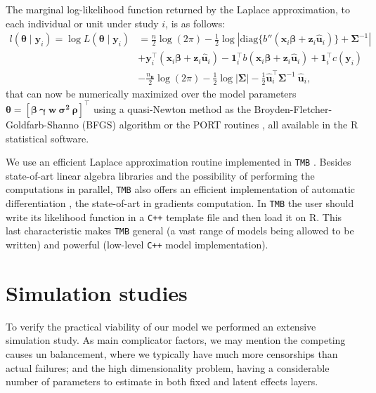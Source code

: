 \documentclass[a4paper,12pt]{article}
\begin{document}
The marginal log-likelihood function returned by the Laplace
approximation, to each individual or unit under study \(i\), is as
follows:
\begin{equation}
 \begin{aligned}
  l(\bm{\theta} \mid \bm{y}_{i}) =
  \log L(\bm{\theta} \mid \bm{y}_{i}) &= \frac{n}{2} \log (2\pi) -
  \frac{1}{2} \log
  \left| \text{diag}\{{b}''(\bm{x}_{i}\bm{\beta} +
                      \bm{z}_{i}\bm{\hat{u}}_{i})
                    \} + \bm{\Sigma}^{-1}
  \right|\\
  &+ \bm{y}_{i}^{\top}
     (\bm{x}_{i}\bm{\beta} + \bm{z}_{i}\bm{\hat{u}}_{i}) -
     \bm{1}_{i}^{\top}
     b(\bm{x}_{i}\bm{\beta} + \bm{z}_{i}\bm{\hat{u}}_{i}) +
     \bm{1}_{i}^{\top} c(\bm{y}_{i})\\
  &- \frac{n_{\bm{u}}}{2} \log (2\pi) -
     \frac{1}{2} \log |\bm{\Sigma}| - \frac{1}{2}
     \bm{\hat{u}}_{i}^{\top}\bm{\Sigma}^{-1}~\bm{\hat{u}}_{i},
 \end{aligned}
 \nonumber
\end{equation}
that can now be numerically maximized over the model parameters
\(\bm{\theta} = [\bm{\beta}~\bm{\gamma}~\bm{w}~\bm{\sigma^{2}}~
  \bm{\rho}]^{\top}\) using a quasi-Newton method as the
Broyden-Fletcher-Goldfarb-Shanno (BFGS) algorithm \citep{nocedal&wright}
or the PORT routines \citep{PORTpaper,PORTreport}, all available in the
R \citep{R21} statistical software.

We use an efficient Laplace approximation routine implemented in
\texttt{TMB} \citep{TMB}. Besides state-of-art linear algebra libraries
and the possibility of performing the computations in parallel,
\texttt{TMB} also offers an efficient implementation of automatic
differentiation \citep{nocedal&wright,corestats,peyre}, the state-of-art
in gradients computation. In \texttt{TMB} the user should write its
likelihood function in a \texttt{C++} template file and then load it on
R. This last characteristic makes \texttt{TMB} general (a vast range of
models being allowed to be written) and powerful (low-level \texttt{C++}
model implementation).

\section{Simulation studies}
\label{simulation}

To verify the practical viability of our model we performed an extensive
simulation study. As main complicator factors, we may mention the
competing causes un balancement, where we typically have much more
censorships than actual failures; and the high dimensionality problem,
having a considerable number of parameters to estimate in both fixed and
latent effects layers.
\end{document}

